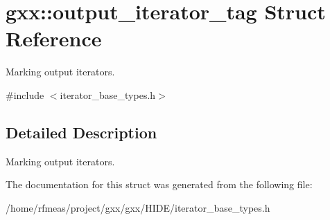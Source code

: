 \hypertarget{structgxx_1_1output__iterator__tag}{}\section{gxx\+:\+:output\+\_\+iterator\+\_\+tag Struct Reference}
\label{structgxx_1_1output__iterator__tag}


Marking output iterators.  




{\ttfamily \#include $<$iterator\+\_\+base\+\_\+types.\+h$>$}



\subsection{Detailed Description}
Marking output iterators. 

The documentation for this struct was generated from the following file\+:\begin{DoxyCompactItemize}
\item 
/home/rfmeas/project/gxx/gxx/\+H\+I\+D\+E/iterator\+\_\+base\+\_\+types.\+h\end{DoxyCompactItemize}
